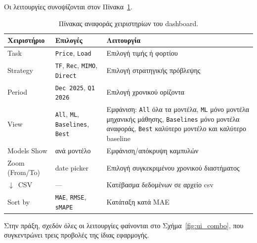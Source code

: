 Οι λειτουργίες συνοψίζονται στον Πίνακα~\ref{tab:dash_controls}.

\begin{table}[H]
  \centering
  \caption{Πίνακας αναφοράς χειριστηρίων του dashboard.}
  \label{tab:dash_controls}
  \small
  \begin{tabular}{p{2.6cm}p{3.4cm}p{7.6cm}}
    \toprule
    \textbf{Χειριστήριο} & \textbf{Επιλογές} & \textbf{Λειτουργία} \\
    \midrule
    Task        & \texttt{Price}, \texttt{Load}                          & Επιλογή τιμής ή φορτίου \\[0.3em]
    Strategy    & \texttt{TF}, \texttt{Rec}, \texttt{MIMO}, \texttt{Direct} & Επιλογή στρατηγικής πρόβλεψης \\[0.3em]
    Period      & \texttt{Dec 2025}, \texttt{Q1 2026}                    & Επιλογή χρονικού ορίζοντα \\[0.3em]
    View        & \texttt{All}, \texttt{ML}, \texttt{Baselines}, \texttt{Best} & Εμφάνιση: \texttt{All} όλα τα μοντέλα, \texttt{ML} μόνο μοντέλα μηχανικής μάθησης, \texttt{Baselines} μόνο μοντέλα αναφοράς, \texttt{Best} καλύτερο μοντέλο και καλύτερο baseline \\[0.3em]
    Models Show & ανά μοντέλο                                            & Εμφάνιση/απόκρυψη καμπυλών \\[0.3em]
    Zoom (From/To) & date picker                                         & Επιλογή συγκεκριμένου χρονικού διαστήματος \\[0.3em]
    $\downarrow$~CSV & ---                                               & Κατέβασμα δεδομένων σε αρχείο csv \\[0.3em]
    Sort by     & \texttt{MAE}, \texttt{RMSE}, \texttt{sMAPE}            & Κατάταξη κατά MAE \\
    \bottomrule
  \end{tabular}
\end{table}

Στην πράξη, σχεδόν όλες οι λειτουργίες φαίνονται στο Σχήμα~\ref{fig:ui_combo}, που
συγκεντρώνει τρεις προβολές της ίδιας εφαρμογής.


